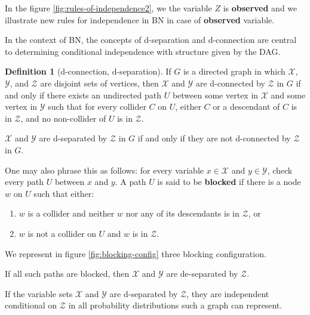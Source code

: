 \documentclass[12pt, a4paper]{article}
\theoremstyle{definition}
\newtheorem{definition}{Definition}[section]
\numberwithin{figure}{section}
\numberwithin{equation}{section}
\numberwithin{table}{section}
\begin{document}
In the figure \ref{fig:rules-of-independence2}, we the variable $Z$ is \textbf{observed} and we illustrate new rules for independence in BN in case of \textbf{observed} variable.


In the context of BN, the concepts of d-separation and d-connection are central to determining conditional independence with structure given by the DAG.

\begin{definition}[d-connection, d-separation]
If $G$ is a directed graph in which $\mathcal{X}$, $\mathcal{Y}$, and $\mathcal{Z}$ are disjoint sets of vertices, then $\mathcal{X}$ and $\mathcal{Y}$ are d-connected by $\mathcal{Z}$ in $G$ if and only if there exists an undirected path $U$ between some vertex in $\mathcal{X}$ and some vertex in $\mathcal{Y}$ such that for every collider $C$ on $U$,  either $C$ or a descendant of $C$ is in $\mathcal{Z}$, and no non-collider of $U$ is in $\mathcal{Z}$.

$\mathcal{X}$ and $\mathcal{Y}$ are d-separated by $\mathcal{Z}$ in $G$ if and only if they are not d-connected by $\mathcal{Z}$ in $G$.

One may also phrase this as follows: for every variable $x \in \mathcal{X}$ and $y \in \mathcal{Y}$, check every path $U$ between $x$ and $y$. A path $U$ is said to be \textbf{blocked} if there is a node $w$ on $U$ such that either:

\begin{enumerate}
    \item $w$ is a collider and neither $w$ nor any of its descendants is in $\mathcal{Z}$, or
    \item $w$ is not a collider on $U$ and $w$ is in $\mathcal{Z}$.
\end{enumerate}

We represent in figure \ref{fig:blocking-config} three blocking configuration.


If all such paths are blocked, then $\mathcal{X}$ and $\mathcal{Y}$ are de-separated by $\mathcal{Z}$.

If the variable sets $\mathcal{X}$ and $\mathcal{Y}$ are d-separated by $\mathcal{Z}$, they are independent conditional on $\mathcal{Z}$ in all probability distributions such a graph can represent.

\end{definition}
\end{document}
